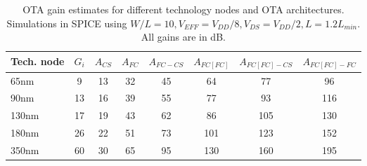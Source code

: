 
\begin{table}[ht]
\caption{OTA gain estimates for different technology nodes and OTA architectures. Simulations in SPICE using $W/L=10, V_{EFF}=V_{DD}/8, V_{DS}
  = V_{DD}/2, L=1.2L_{min}$. All gains are in dB.}
\centering 
\begin{tabular}{ l | c | c | c | c | c | c | c }

\label{tab:ingain}
Tech. node&$G_i$&$A_{CS}$&$A_{FC}$&$A_{FC-CS}$&$A_{FC[FC]}$&$A_{FC[FC]-CS}$&$A_{FC[FC]-FC}$\\
\hline 
65nm	&9	&13     &32	&45	&64	&77	&96\\
90nm	&13	&16     &39	&55	&77	&93	&116\\
130nm	&17	&19     &43	&62	&86	&105	&130\\
180nm	&26	&22     &51	&73	&101	&123	&152\\
350nm	&60	&30     &65	&95	&130	&160	&195\\
\end{tabular}

\end{table}
